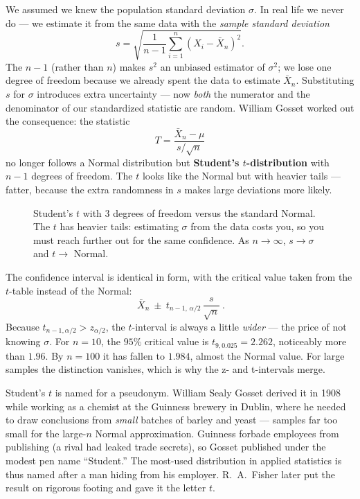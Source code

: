 We assumed we knew the population standard deviation $\sigma$. In real life we never do
--- we estimate it from the same data with the \emph{sample standard deviation}
\[
  s = \sqrt{\frac{1}{n-1}\sum_{i=1}^n (X_i - \bar X_n)^2}.
\]
The $n-1$ (rather than $n$) makes $s^2$ an unbiased estimator of $\sigma^2$; we lose one
degree of freedom because we already spent the data to estimate $\bar X_n$. Substituting
$s$ for $\sigma$ introduces extra uncertainty --- now \emph{both} the numerator and the
denominator of our standardized statistic are random. William Gosset worked out the
consequence: the statistic
\[
  T = \frac{\bar X_n - \mu}{s/\sqrt n}
\]
no longer follows a Normal distribution but \textbf{Student's $t$-distribution} with
$n-1$ degrees of freedom. The $t$ looks like the Normal but with heavier tails ---
fatter, because the extra randomness in $s$ makes large deviations more likely.

\begin{figure}[H]
\centering
{}
\caption{Student's $t$ with $3$ degrees of freedom versus the standard Normal. The $t$
has heavier tails: estimating $\sigma$ from the data costs you, so you must reach
further out for the same confidence. As $n\to\infty$, $s\to\sigma$ and $t\to$ Normal.}
\label{ch32:fig-t}
\end{figure}

The confidence interval is identical in form, with the critical value taken from the
$t$-table instead of the Normal:
\[
  \boxed{\ \bar X_n \ \pm\ t_{n-1,\,\alpha/2}\,\frac{s}{\sqrt n}\ } .
\]
Because $t_{n-1,\alpha/2} > z_{\alpha/2}$, the $t$-interval is always a little
\emph{wider} --- the price of not knowing $\sigma$. For $n = 10$, the $95\%$
critical value is $t_{9,0.025} = 2.262$, noticeably more than $1.96$. By $n = 100$ it
has fallen to $1.984$, almost the Normal value. For large samples the distinction
vanishes, which is why the z- and t-intervals merge.

\begin{historybox}
Student's $t$ is named for a pseudonym. William Sealy Gosset derived it in 1908 while
working as a chemist at the Guinness brewery in Dublin, where he needed to draw
conclusions from \emph{small} batches of barley and yeast --- samples far too small for
the large-$n$ Normal approximation. Guinness forbade employees from publishing (a rival
had leaked trade secrets), so Gosset published under the modest pen name ``Student.''
The most-used distribution in applied statistics is thus named after a man hiding from
his employer. R.~A.~Fisher later put the result on rigorous footing and gave it the
letter $t$.
\end{historybox}


